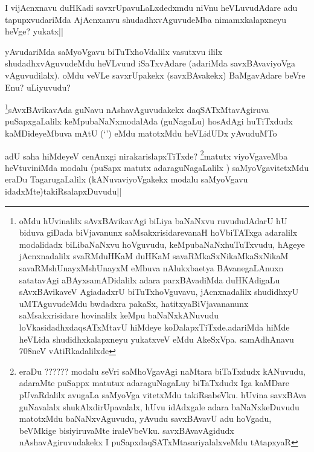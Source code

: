 \begin{artha}
I vijAcnxnavu duHKadi savxrUpavuLaLxdedxmdu niVnu heVLuvudAdare adu tapupxvudariMda AjAcnxanvu shudadhxvAguvudeMba nimamxkalapxneyu heVge? yukatx||
\end{artha}

\begin{artha}
yAvudariMda saMyoVgavu biTuTxhoVdalilx vasutxvu ililx shudadhxvAguvudeMdu heVLvuud iSaTxvAdare (adariMda savxBAvaviyoVga vAguvudilalx). oMdu veVLe savxrUpakekx (savxBAvakekx) BaMgavAdare beVre Enu? uLiyuvudu?
\end{artha}

\begin{artha}
\footnote{oMdu hUvinalilx sAvxBAvikavAgi biLiya baNaNxvu ruvududAdarU hU biduva giDada biVjavanunx saMsakxrisidarevanaH hoVbiTATxga adaralilx modalidadx biLibaNaNxvu hoVguvudu, keMpubaNaNxhuTuTxvudu, hAgeye jAcnxnadalilx svaRMduHKaM duHKaM savaRMkaSxNikaMkaSxNikaM savaRMshUnayxMshUnayxM eMbuva nAlukxbaetya BAvanegaLAnuxn satatavAgi aBAyxsamADidalilx adara parxBAvadiMda duHKAdigaLu sAvxBAvikaveV AgiadadxrU biTuTxhoVguvavu, jAcnxnadalilx shudidhxyU uMTAguvudeMdu bwdadxra pakaSx, hatitxyaBiVjavananunx saMsakxrisidare hovinalilx keMpu baNaNxkANuvudu loVkasidadhxdaqsATxMtavU hiMdeye koDalapxTiTxde.adariMda hiMde heVLida shudidhxkalapxneyu yukatxveV eMdu AkeSxVpa. samAdhAnavu 708neV vAtiRkadalilxde}sAvxBAvikavAda guNavu nAshavAguvudakekx daqSATxMtavAgiruva puSapxgaLalilx keMpubaNaNxmodalAda (guNagaLu) hosAdAgi huTiTxdudx kaMDideyeMbuva mAtU (`\stext') eMdu matotxMdu heVLidUDx yAvuduMTo
\end{artha}

\begin{artha}
adU saha hiMdeyeV cenAnxgi nirakarislapxTiTxde? \footnote{eraDu ?????? modalu seVri saMhoVgavAgi naMtara biTaTxdudx kANuvudu, adaraMte puSappx matutux adaraguNagaLuy biTaTxdudx Iga kaMDare pUvaRdalilx avugaLa saMyoVga vitetxMdu takiRsabeVku. hUvina savxBAva guNavalalx shukAlxdirUpavalalx, hUvu idAdxgale adara baNaNxkeDuvudu matotxMdu baNaNxvAguvudu, yAvudu savxBAvavU adu hoVgadu, beVMkige bisiyiruvaMte iraleVbeVku. savxBAvavAgidudx nAshavAgiruvudakekx I puSapxdaqSATxMtasariyalalxveMdu tAtapxyaR}matutx viyoVgaveMba heVtuviniMda modalu (puSapx matutx adaraguNagaLalilx ) saMyoVgavitetxMdu eraDu TagarugaLalilx (kANuvaviyoVgakekx modalu saMyoVgavu idadxMte)takiRsalapxDuvudu||
\end{artha}

